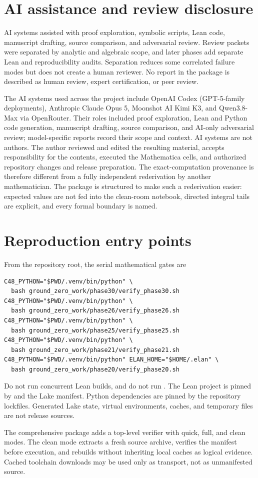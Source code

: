 \documentclass[10pt]{article}
\begin{document}
\section{AI assistance and review disclosure}\label{sup:disclosure}

AI systems assisted with proof exploration, symbolic scripts, Lean code,
manuscript drafting, source comparison, and adversarial review.  Review
packets were separated by analytic and algebraic scope, and later phases add
separate Lean and reproducibility audits.  Separation reduces some correlated
failure modes but does not create a human reviewer.  No report in the package
is described as human review, expert certification, or peer review.

The AI systems used across the project include OpenAI Codex (GPT-5-family
deployments), Anthropic Claude Opus 5, Moonshot AI Kimi K3, and Qwen3.8-Max
via OpenRouter.  Their roles included proof exploration, Lean and Python code
generation, manuscript drafting, source comparison, and AI-only adversarial
review; model-specific reports record their scope and context.  AI systems
are not authors.  The author reviewed and edited the resulting material,
accepts responsibility for the contents, executed the Mathematica cells, and
authorized repository changes and release preparation.
The exact-computation provenance is therefore different from a fully
independent rederivation by another mathematician.  The package is structured
to make such a rederivation easier: expected values are not fed into the
clean-room notebook, directed integral tails are explicit, and every formal
boundary is named.

\section{Reproduction entry points}\label{sup:reproduction}

From the repository root, the serial mathematical gates are
\begin{verbatim}
C48_PYTHON="$PWD/.venv/bin/python" \
  bash ground_zero_work/phase30/verify_phase30.sh
C48_PYTHON="$PWD/.venv/bin/python" \
  bash ground_zero_work/phase26/verify_phase26.sh
C48_PYTHON="$PWD/.venv/bin/python" \
  bash ground_zero_work/phase25/verify_phase25.sh
C48_PYTHON="$PWD/.venv/bin/python" \
  bash ground_zero_work/phase21/verify_phase21.sh
C48_PYTHON="$PWD/.venv/bin/python" ELAN_HOME="$HOME/.elan" \
  bash ground_zero_work/phase20/verify_phase20.sh
\end{verbatim}
Do not run concurrent Lean builds, and do not run .  The
Lean project is pinned by \code{lean-toolchain} and the Lake manifest.
Python dependencies are pinned by the repository lockfiles.  Generated Lake
state, virtual environments, caches, and temporary files are not release
sources.

The comprehensive package adds a top-level verifier with quick, full, and
clean modes.  The clean mode extracts a fresh source archive, verifies the
manifest before execution, and rebuilds without inheriting local caches as
logical evidence.  Cached toolchain downloads may be used only as transport,
not as unmanifested source.



\end{document}
